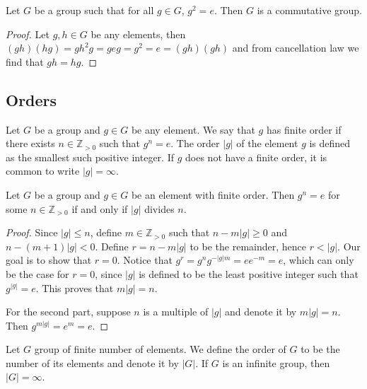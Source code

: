 \begin{corollary}
  Let \(G\) be a group such that for all \(g \in G\), \(g^2 = e\). Then \(G\) is
  a commutative group.
\end{corollary}

\begin{proof}
  Let \(g, h \in G\) be any elements, then \((g h) (h g) = g h^2 g = g e g = g^2
  = e = (g h) (g h)\) and from cancellation law we find that \(g h = h g\).
\end{proof}

\subsection{Orders}

\begin{definition}\label{def: group elem order}
  Let \(G\) be a group and \(g \in G\) be any element. We say that \(g\) has
  finite order if there exists \(n \in \mathbb{Z}_{> 0}\) such that \(g^n = e\). 
  The order \(|g|\) of the element \(g\) is defined as the smallest such
  positive integer. If \(g\) does not have a finite order, it is common to write
   \(|g| = \infty\).
\end{definition}

\begin{lemma}\label{lem: order and multiples}
  Let \(G\) be a group and \(g \in G\) be an element with finite order. Then
  \(g^n = e\) for some \(n \in \mathbb{Z}_{> 0}\) if and only if \(|g|\) divides
  \(n\).
\end{lemma}

\begin{proof}
  Since \(|g| \leq n\), define \(m \in \mathbb{Z}_{> 0}\) such that \(n - m |g|
  \geq 0\) and \(n - (m + 1) |g| < 0\). Define \(r = n - m |g|\) to be the
  remainder, hence \(r < |g|\). Our goal is to show that \(r = 0\). Notice that
  \(g^r = g^n g^{-|g| m} = e e^{-m} = e\), which can only be the case for \(r =
  0\), since \(|g|\) is defined to be the least positive integer such that
  \(g^{|g|} = e\). This proves that \(m |g| = n\).

  For the second part, suppose \(n\) is a multiple of \(|g|\) and denote it by
  \(m|g| = n\). Then \(g^{m |g|} = e^m = e\).
\end{proof}

\begin{definition}
  Let \(G\) group of finite number of elements. We define the order of \(G\) to
  be the number of its elements and denote it by \(|G|\). If \(G\) is an
  infinite group, then \(|G| = \infty\).
\end{definition}

